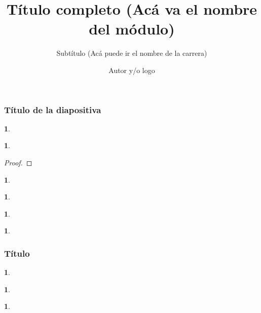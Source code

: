\documentclass[10pt,spanish,compress,letterpaper,leqno,hyperref={pdfencoding=unicode},aspectratio=169,usenames,dvipsnames,leqno,notheorems]{beamer}
\title[Título corto]{Título completo (Acá va el nombre del módulo)}
\subtitle{Subtítulo (Acá puede ir el nombre de la carrera)}
\author[]{Autor y/o logo}
\date{}
\newtheorem{theorem}{\translate{Theorem}}[section]
\newtheorem{theorem}{\translate{Theorem}}
\newtheorem{corollary}{\translate{Corollary}}
\newtheorem{proposition}{\translate{Proposition}}
\newtheorem{lemma}{\translate{Lemma}}
\newtheorem*{solution}{\translate{Solution}}
\newtheorem*{remark}{\translate{Remark}}
\theoremstyle{definition}
\newtheorem{definition}{\translate{Definition}}
\theoremstyle{example}
\newtheorem*{example}{\translate{Example}}
\newtheorem*{exercise}{\translate{Exercise}}
\theoremstyle{plain}
\begin{document}


\begin{frame}
	\frametitle{Título de la diapositiva}


	\begin{definition}
	\end{definition}

	\begin{theorem}
	\end{theorem}

	\begin{proof}
	\end{proof}

	\begin{proposition}
	\end{proposition}

	\begin{corollary}
	\end{corollary}

	\begin{lemma}
	\end{lemma}

	\begin{remark}
	\end{remark}

\end{frame}

\begin{frame}
	\frametitle{Título}
	\begin{example}
	\end{example}

	\begin{exercise}
	\end{exercise}

	\begin{solution}
	\end{solution}

	\begin{challenge}
	\end{challenge}

	\begin{block} %
	\end{block}

\end{frame}
\end{document}
